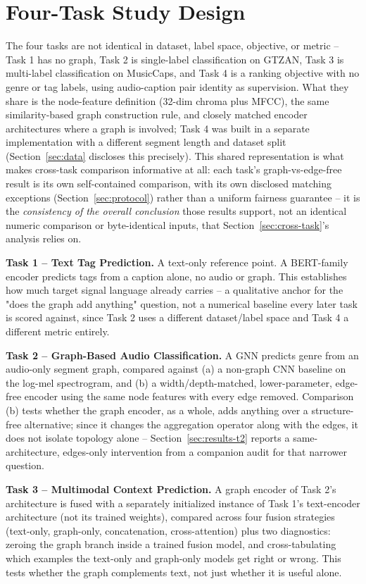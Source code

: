 \section{Four-Task Study Design}\label{sec:design}

The four tasks are not identical in dataset, label space, objective, or metric -- Task 1 has
no graph, Task 2 is single-label classification on GTZAN, Task 3 is multi-label
classification on MusicCaps, and Task 4 is a ranking objective with no genre or tag labels,
using audio-caption pair identity as supervision. What they share is the node-feature
definition (32-dim chroma plus MFCC), the same similarity-based graph construction rule, and
closely matched encoder architectures where a graph is involved; Task 4 was built in a
separate implementation with a different segment length and dataset split
(Section~\ref{sec:data} discloses this precisely). This shared representation is what makes
cross-task comparison informative at all: each task's graph-vs-edge-free result is its own
self-contained comparison, with its own disclosed matching exceptions
(Section~\ref{sec:protocol}) rather than a uniform fairness guarantee -- it is the
\emph{consistency of the overall conclusion} those results support, not an identical numeric
comparison or byte-identical inputs, that Section~\ref{sec:cross-task}'s analysis relies on.

\textbf{Task 1 -- Text Tag Prediction.} A text-only reference point. A BERT-family encoder
predicts tags from a caption alone, no audio or graph. This establishes how much target
signal language already carries -- a qualitative anchor for the "does the graph add
anything" question, not a numerical baseline every later task is scored against, since Task
2 uses a different dataset/label space and Task 4 a different metric entirely.

\textbf{Task 2 -- Graph-Based Audio Classification.} A GNN predicts genre from an audio-only
segment graph, compared against (a) a non-graph CNN baseline on the log-mel spectrogram, and
(b) a width/depth-matched, lower-parameter, edge-free encoder using the same node features
with every edge removed. Comparison (b) tests whether the graph encoder, as a whole, adds
anything over a structure-free alternative; since it changes the aggregation operator along
with the edges, it does not isolate topology alone -- Section~\ref{sec:results-t2} reports a
same-architecture, edges-only intervention from a companion audit for that narrower question.

\textbf{Task 3 -- Multimodal Context Prediction.} A graph encoder of Task 2's architecture is
fused with a separately initialized instance of Task 1's text-encoder architecture (not its
trained weights), compared across four fusion strategies (text-only, graph-only,
concatenation, cross-attention) plus two diagnostics: zeroing the graph branch inside a
trained fusion model, and cross-tabulating which examples the text-only and graph-only models
get right or wrong. This tests whether the graph complements text, not just whether it is
useful alone.

